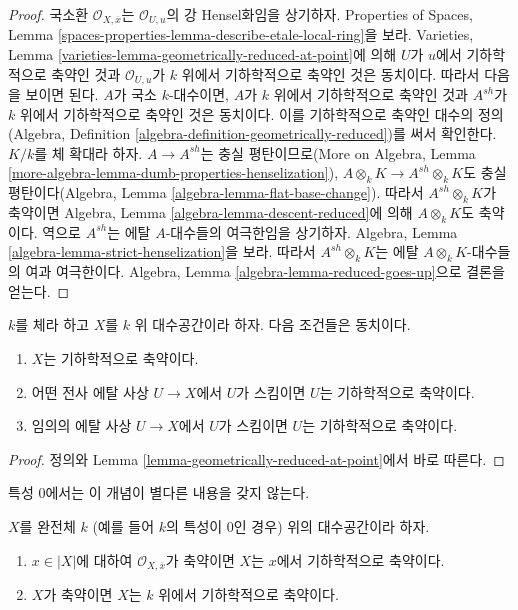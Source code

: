 \begin{proof}
국소환 $\mathcal{O}_{X, \overline{x}}$는 $\mathcal{O}_{U, u}$의 강
Hensel화임을 상기하자. Properties of Spaces, Lemma
\ref{spaces-properties-lemma-describe-etale-local-ring}을 보라.
Varieties, Lemma \ref{varieties-lemma-geometrically-reduced-at-point}에 의해
$U$가 $u$에서 기하학적으로 축약인 것과 $\mathcal{O}_{U, u}$가 $k$ 위에서
기하학적으로 축약인 것은 동치이다. 따라서 다음을 보이면 된다. $A$가 국소
$k$-대수이면, $A$가 $k$ 위에서 기하학적으로 축약인 것과 $A^{sh}$가
$k$ 위에서 기하학적으로 축약인 것은 동치이다. 이를 기하학적으로 축약인
대수의 정의(Algebra, Definition
\ref{algebra-definition-geometrically-reduced})를 써서 확인한다. $K/k$를 체
확대라 하자. $A \to A^{sh}$는 충실 평탄이므로(More on Algebra, Lemma
\ref{more-algebra-lemma-dumb-properties-henselization}),
$A \otimes_k K \to A^{sh} \otimes_k K$도 충실 평탄이다(Algebra, Lemma
\ref{algebra-lemma-flat-base-change}). 따라서
$A^{sh} \otimes_k K$가 축약이면 Algebra, Lemma
\ref{algebra-lemma-descent-reduced}에 의해 $A \otimes_k K$도 축약이다.
역으로 $A^{sh}$는 에탈 $A$-대수들의 여극한임을 상기하자.
Algebra, Lemma \ref{algebra-lemma-strict-henselization}을 보라.
따라서 $A^{sh} \otimes_k K$는 에탈 $A \otimes_k K$-대수들의 여과
여극한이다. Algebra, Lemma \ref{algebra-lemma-reduced-goes-up}으로
결론을 얻는다.
\end{proof}

\begin{lemma}
\label{lemma-geometrically-reduced}
$k$를 체라 하고 $X$를 $k$ 위 대수공간이라 하자.
다음 조건들은 동치이다.
\begin{enumerate}
\item $X$는 기하학적으로 축약이다.
\item 어떤 전사 에탈 사상 $U \to X$에서 $U$가 스킴이면
$U$는 기하학적으로 축약이다.
\item 임의의 에탈 사상 $U \to X$에서 $U$가 스킴이면
$U$는 기하학적으로 축약이다.
\end{enumerate}
\end{lemma}

\begin{proof}
정의와 Lemma \ref{lemma-geometrically-reduced-at-point}에서 바로 따른다.
\end{proof}

\noindent
특성 0에서는 이 개념이 별다른 내용을 갖지 않는다.

\begin{lemma}
\label{lemma-perfect-reduced}
$X$를 완전체 $k$ (예를 들어 $k$의 특성이 0인 경우) 위의 대수공간이라 하자.
\begin{enumerate}
\item $x \in |X|$에 대하여 $\mathcal{O}_{X, \overline{x}}$가 축약이면
$X$는 $x$에서 기하학적으로 축약이다.
\item $X$가 축약이면 $X$는 $k$ 위에서 기하학적으로 축약이다.
\end{enumerate}
\end{lemma}

